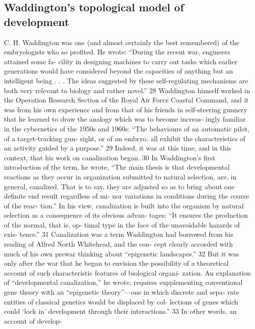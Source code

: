 \subsection{Waddington's topological model of development}
\label{Waddington}
\begin{longquote}
C. H. Waddington was one (and almost certainly the
best remembered) of the embryologists who so profited. He
wrote: “During the recent war, engineers attained some fa-
cility in designing machines to carry out tasks which earlier
generations would have considered beyond the capacities of
anything but an intelligent being . . . The ideas suggested
by these self-regulating mechanisms are both very relevant
to biology and rather novel.” 28 Waddington himself worked
in the Operation Research Section of the Royal Air Force
Coastal Command, and it was from his own experience and
from that of his friends in self-steering gunnery that he
learned to draw the analogy which was to become increas-
ingly familiar in the cybernetics of the 1950s and 1960s: “The
behaviours of an automatic pilot, of a target-tracking gun-
sight, or of an embryo, all exhibit the characteristics of an
activity guided by a purpose.” 29 Indeed, it was at this time,
and in this context, that his work on canalization began. 30
In Waddington’s first introduction of the term, he
wrote, “The main thesis is that developmental reactions as
they occur in organization submitted to natural selection,
are, in general, canalized. That is to say, they are adjusted so
as to bring about one definite end result regardless of mi-
nor variations in conditions during the course of the reac-
tion.” In his view, canalization is built into the organism by
natural selection as a consequence of its obvious advan-
tages: “It ensures the production of the normal, that is, op-
timal type in the face of the unavoidable hazards of exis-
tence.” 31 Canalization was a term Waddington had borrowed
from his reading of Alfred North Whitehead, and the con-
cept clearly accorded with much of his own prewar thinking
about “epigenetic landscapes.” 32 But it was only after the
war that he began to envision the possibility of a theoretical
account of such characteristic features of biological organi-
zation. An explanation of “developmental canalization,” he
wrote, requires supplementing conventional gene theory
with an “epigenetic theory”—one in which discrete and sepa-
rate entities of classical genetics would be displaced by col-
lections of genes which could ‘lock in’ development through
their interactions.” 33 In other words, an account of develop-

\end{longquote}
